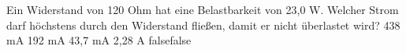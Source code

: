     {Ein Widerstand von 120 Ohm hat eine Belastbarkeit von 23,0 W. Welcher Strom darf höchstens durch den Widerstand fließen, damit er nicht überlastet wird?}
    {438 mA}
    {192 mA}
    {43,7 mA}
    {2,28 A}
    {false}{false}